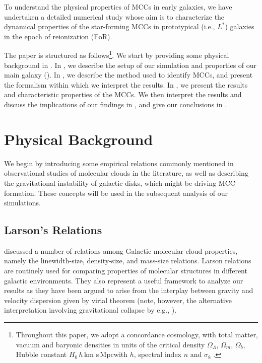 \IfFileExists{emulateapjlegacy.cls}{\documentclass[iop]{emulateapjlegacy}}{\documentclass[iop]{emulateapj}}
\begin{document}
To understand the physical properties of MCCs in early galaxies, we have undertaken a detailed numerical study whose aim is to characterize the dynamical properties of the star-forming MCCs in prototypical (i.e., $L^*$) galaxies in the epoch of reionization (EoR).

The paper is structured as follows\footnote{Throughout this paper, we adopt a concordance cosmology, with total matter, vacuum and baryonic densities in units of the critical density $\Omega_{\Lambda}$, $\Omega_m$, $\Omega_b$, Hubble constant $H_0$\,$h$\,km s\pmOne\,Mpc\pmOne with $h$, spectral index $n$ and $\sigma_8$ \citep{Planck14a}.}. We start by providing some physical background in . In , we describe the setup of our simulation and properties of our main galaxy (\flower). In , we describe the method used to identify MCCs, and present the formalism within which we interpret the results. In , we present the results and characteristic properties of the MCCs. We then interpret the results and discuss the implications of our findings in , and give our conclusions in .
%

\section{Physical Background}\label{sec:Back}
We begin by introducing some empirical relations commonly mentioned in observational studies of molecular clouds in the literature, as well as describing the gravitational instability of galactic disks, which might be driving MCC formation. These concepts will be used in the subsequent analysis of our simulations.

\subsection{Larson's Relations}\label{sec:PVE}

\citet{Larson81a} discussed a number of relations among Galactic molecular cloud properties, namely the linewidth-size, density-size, and mass-size relations. Larson relations are routinely used for comparing properties of molecular structures in different galactic environments. They also represent a useful framework to analyze our results as they have been argued to arise from the interplay between gravity and velocity dispersion given by virial theorem (note, however, the alternative interpretation involving gravitational collapse by e.g., \citealt{Ballesteros-Paredes11a}).
\end{document}
